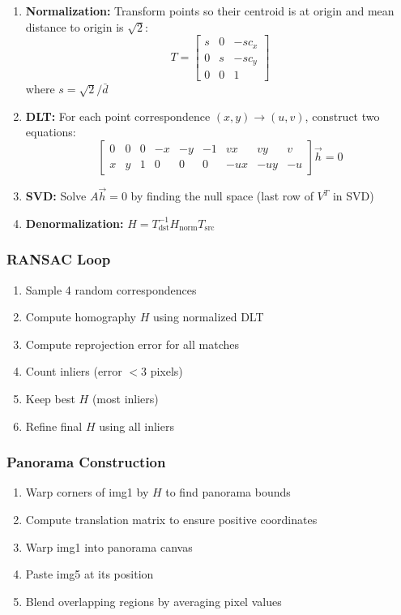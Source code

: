 \documentclass[11pt,a4paper]{article}
\begin{document}
\begin{enumerate}
    \item \textbf{Normalization:} Transform points so their centroid is at origin and mean distance to origin is $\sqrt{2}$:
    \[
    T = \begin{bmatrix} s & 0 & -s c_x \\ 0 & s & -s c_y \\ 0 & 0 & 1 \end{bmatrix}
    \]
    where $s = \sqrt{2} / \bar{d}$
    
    \item \textbf{DLT:} For each point correspondence $(x,y) \to (u,v)$, construct two equations:
    \[
    \begin{bmatrix} 0 & 0 & 0 & -x & -y & -1 & vx & vy & v \\ x & y & 1 & 0 & 0 & 0 & -ux & -uy & -u \end{bmatrix} \vec{h} = 0
    \]
    
    \item \textbf{SVD:} Solve $A\vec{h} = 0$ by finding the null space (last row of $V^T$ in SVD)
    
    \item \textbf{Denormalization:} $H = T_{\text{dst}}^{-1} H_{\text{norm}} T_{\text{src}}$
\end{enumerate}

\subsubsection{RANSAC Loop}
\begin{enumerate}
    \item Sample 4 random correspondences
    \item Compute homography $H$ using normalized DLT
    \item Compute reprojection error for all matches
    \item Count inliers (error $< 3$ pixels)
    \item Keep best $H$ (most inliers)
    \item Refine final $H$ using all inliers
\end{enumerate}

\subsubsection{Panorama Construction}
\begin{enumerate}
    \item Warp corners of img1 by $H$ to find panorama bounds
    \item Compute translation matrix to ensure positive coordinates
    \item Warp img1 into panorama canvas
    \item Paste img5 at its position
    \item Blend overlapping regions by averaging pixel values
\end{enumerate}
\end{document}
